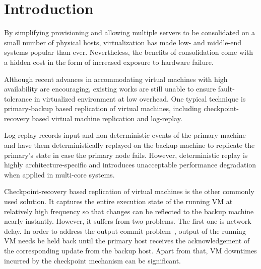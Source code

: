 \section{Introduction} \label{sec:intro}

By simplifying provisioning and allowing multiple servers to be consolidated on a 
small number of physical hosts, virtualization has made low- and middle-end systems 
popular than ever. Nevertheless, the benefits of consolidation come with a hidden cost 
in the form of increased exposure to hardware failure. 

Although recent advances in accommodating virtual machines with high availability 
are encouraging, existing works are still unable to ensure fault-tolerance in virtualized 
environment at low overhead. One typical technique is primary-backup based replication of 
virtual machines, including checkpoint-recovery based virtual machine replication and log-replay.



Log-replay records input and non-deterministic events of the primary machine 
and have them deterministically replayed on the backup machine to replicate the primary's state 
in case the primary node fails. However, deterministic replay is highly architecture-specific and 
introduces unacceptable performance degradation when applied in multi-core systems.

Checkpoint-recovery based replication of virtual machines is the other commonly used solution. 
It captures the entire execution state of the running VM at relatively high frequency so that changes 
can be reflected to the backup machine nearly instantly. However, it suffers from two problems. 
The first one is network delay. In order to address the output commit problem~\cite{strom1987volatile}, 
output of the running VM needs be held back until the primary host receives the acknowledgement of 
the corresponding update from the backup host. Apart from that, VM downtimes incurred by the 
checkpoint mechanism can be significant.

